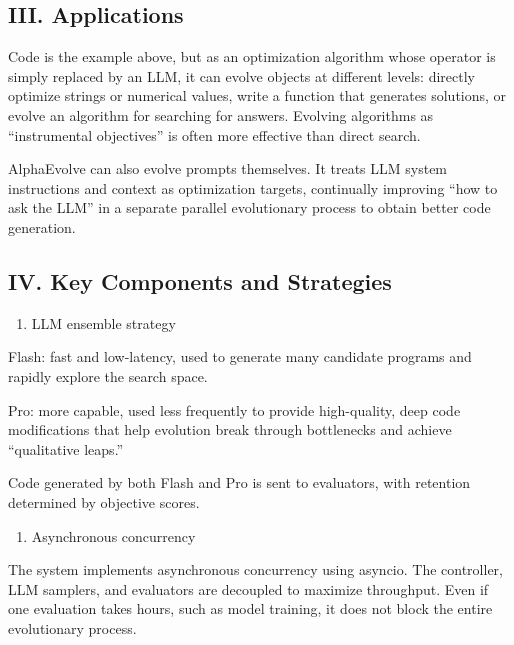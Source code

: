 \hypertarget{iii.-applications}{%
\subsection{III. Applications}\label{iii.-applications}}

Code is the example above, but as an optimization algorithm whose operator is simply replaced by an LLM, it can evolve objects at different levels: directly optimize strings or numerical values, write a function that generates solutions, or evolve an algorithm for searching for answers. Evolving algorithms as ``instrumental objectives'' is often more effective than direct search.

AlphaEvolve can also evolve prompts themselves. It treats LLM system instructions and context as optimization targets, continually improving ``how to ask the LLM'' in a separate parallel evolutionary process to obtain better code generation.

\hypertarget{iv.-key-components-and-strategies}{%
\subsection{IV. Key Components and Strategies}\label{iv.-key-components-and-strategies}}

\begin{enumerate}
\def\labelenumi{(\Roman{enumi})}
\tightlist
\item
  LLM ensemble strategy
\end{enumerate}

Flash: fast and low-latency, used to generate many candidate programs and rapidly explore the search space.

Pro: more capable, used less frequently to provide high-quality, deep code modifications that help evolution break through bottlenecks and achieve ``qualitative leaps.''

Code generated by both Flash and Pro is sent to evaluators, with retention determined by objective scores.

\begin{enumerate}
\def\labelenumi{(\Roman{enumi})}
\setcounter{enumi}{1}
\tightlist
\item
  Asynchronous concurrency
\end{enumerate}

The system implements asynchronous concurrency using asyncio. The controller, LLM samplers, and evaluators are decoupled to maximize throughput. Even if one evaluation takes hours, such as model training, it does not block the entire evolutionary process.

